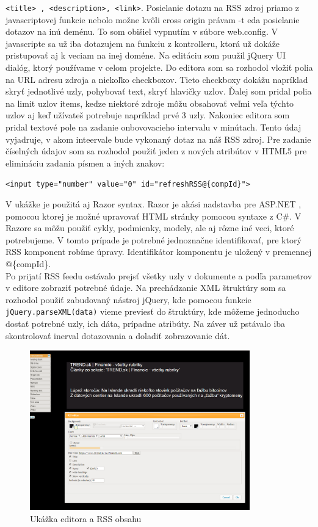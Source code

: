 \documentclass[11pt, oneside]{report}
\begin{document}
\lstinline!<title> , <description>, <link>!. Posielanie dotazu na RSS zdroj priamo z javascriptovej funkcie nebolo možne kvôli cross origin právam -t eda posielanie  dotazov na inú deménu. To som obišiel vypnutím v súbore web.config. V javascripte sa už iba dotazujem na funkciu z kontrolleru, ktorá  už dokáže pristupovať aj k veciam  na inej doméne. Na editáciu som puužil jQuery UI dialóg, ktorý používame v celom projekte. Do editora som sa rozhodol vložiť polia na URL adresu zdroja a niekoľko checkboxov. Tieto checkboxy dokážu napríklad skryť jednotlivé  uzly,  pohybovať text, skryť hlavičky uzlov. Ďalej som pridal polia na limit uzlov items, keďze niektoré zdroje môžu obsahovať veľmi veľa týchto uzlov aj keď užívateš potrebuje napríklad prvé 3 uzly. Nakoniec editora som pridal textové pole na zadanie onbovovacieho intervalu v minútach. Tento údaj vyjadruje, v akom inteervale bude vykonaný dotaz na náš RSS zdroj. Pre zadanie číselných údajov som sa rozhodol použiť jeden z nových atribútov  v HTML5 pre elimináciu zadania písmen a iných znakov:
\begin{center}
\lstset{language=HTML5}
\lstinline!<input type="number" value="0" id="refreshRSS@{compId}">!\\
\end{center}
V ukážke je použitá aj Razor syntax. Razor je  akási nadstavba pre ASP.NET , pomocou ktorej je možné upravovať HTML stránky pomocou syntaxe z C\#. V Razore  sa môžu použiť cykly, podmienky, modely, ale aj rôzne iné veci, ktoré potrebujeme. V tomto prípade je potrebné jednoznačne identifikovať, pre ktorý RSS komponent robíme úpravy. Identifikátor komponentu je uložený v premennej \textsf{@\{compId\}}.\\
Po prijatí RSS feedu ostávalo prejsť všetky uzly v dokumente a podľa parametrov v editore  zobraziť potrebné údaje. Na prechádzanie  XML štruktúry som sa rozhodol použiť zabudovaný nástroj jQuery, kde pomocou funkcie 
\lstset{language=Javascript}
\lstinline!jQuery.parseXML(data)!
vieme previesť  do štruktúry, kde môžeme jednoducho  dostať potrebné uzly, ich dáta, prípadne atribúty. Na záver už pstávalo iba skontrolovať inerval dotazovania a doladiť zobrazovanie  dát.
\begin{figure}[h]
    \centering
    \includegraphics[width=0.85\textwidth]{RSS}
    \caption{Ukážka editora a RSS obsahu}
    \label{fig:mesh1}
\end{figure}
\end{document}
